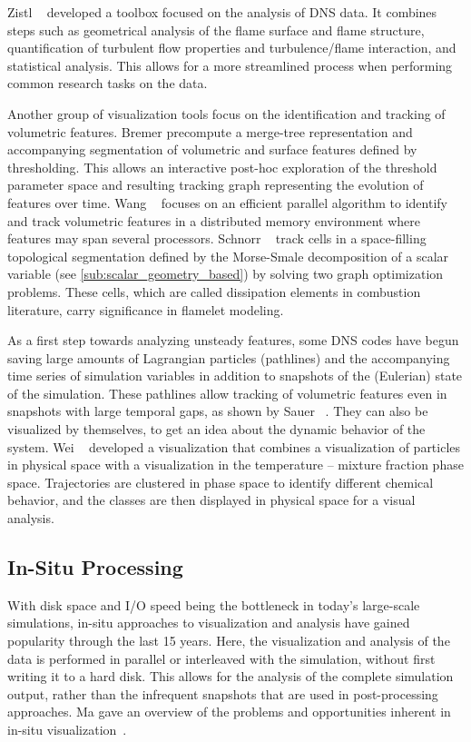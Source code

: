 %
Zistl \etal~\cite{Zistl2009} developed a toolbox focused on the analysis of
\ac{DNS} data.
%
It combines steps such as geometrical analysis of the flame surface and flame
structure, quantification of turbulent flow properties and turbulence/flame
interaction, and statistical analysis.
%
This allows for a more streamlined process when performing common research
tasks on the data.
%

%
Another group of visualization tools focus on the identification and tracking of
volumetric features.
%
Bremer \etal precompute a merge-tree representation and accompanying
segmentation of volumetric \cite{Bremer2009,Bremer2011} and surface features
\cite{Bremer2010} defined by thresholding.
%
This allows an interactive post-hoc exploration of the threshold parameter
space and resulting tracking graph representing the evolution of features over
time.
%
Wang \etal~\cite{Wang2013} focuses on an efficient parallel algorithm to
identify and track volumetric features in a distributed memory environment
where features may span several processors.
%
Schnorr \etal~\cite{Schnorr2018} track cells in a space-filling topological
segmentation defined by the Morse-Smale decomposition of a scalar variable (see
\cref{sub:scalar_geometry_based}) by solving two graph optimization problems.
%
These cells, which are called dissipation elements in combustion literature,
carry significance in flamelet modeling.
%

%
As a first step towards analyzing unsteady features, some \ac{DNS} codes have
begun saving large amounts of Lagrangian particles (pathlines) and the
accompanying time series of simulation variables in addition to snapshots of the
(Eulerian) state of the simulation.
%
These pathlines allow tracking of volumetric features even in snapshots with
large temporal gaps, as shown by Sauer \etal~\cite{Sauer2014}.
%
They can also be visualized by themselves, to get an idea about the dynamic
behavior of the system.
%
Wei \etal~\cite{Wei2011} developed a visualization that combines a visualization
of particles in physical space with a visualization in the temperature --
mixture fraction phase space.
%
Trajectories are clustered in phase space to identify different chemical
behavior, and the classes are then displayed in physical space for a visual
analysis.
%
%
%
\subsection{In-Situ Processing} %
\label{sub:in_situ_processing}
%
With disk space and I/O speed being the bottleneck in today's large-scale
simulations, in-situ approaches to visualization and analysis have gained
popularity through the last 15 years.
%
Here, the visualization and analysis of the data is performed in parallel or
interleaved with the simulation, without first writing it to a hard disk.
%
This allows for the analysis of the complete simulation output, rather than
the infrequent snapshots that are used in post-processing approaches.
%
Ma gave an overview of the problems and opportunities inherent in in-situ
visualization~\cite{Ma2009}.
%

